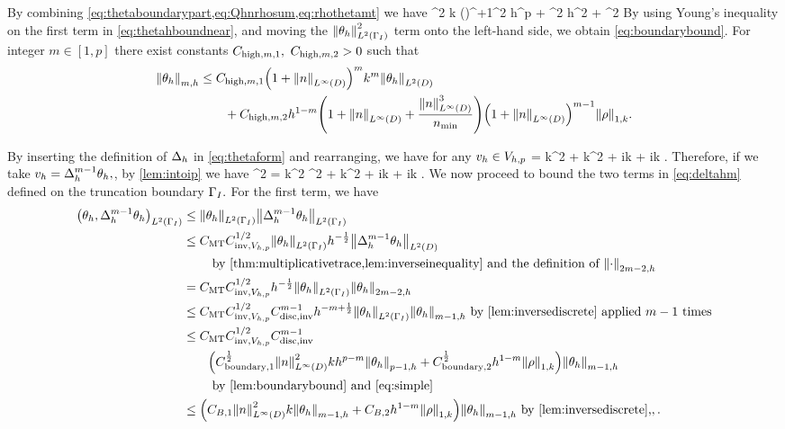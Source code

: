 \eeq
By combining \cref{eq:thetaboundarypart,eq:Qhnrhosum,eq:rhothetamt} we have
\beq\label{eq:thetahboundnear}
\NLtGI{\thetah}^2 \leq k \Cmess \mleft(\En\nvar\mright)^{+1}^2 h^p \NW{\rho} + \half \CMT^2  h\NW{\rho}^2 + \half \NLtGI{\thetah}^2
\eeq
By using Young's inequality on the first term in \cref{eq:thetahboundnear}, and moving the $\NLtGI{\thetah}^2$ term onto the left-hand side, we obtain \cref{eq:boundarybound}.
\epf
\tohere
{}\label{lem:higherbound}
For integer $m \in [1,p]$ there exist constants $C_{\mathrm{high},m,1},$ $C_{\mathrm{high},m,2} > 0$ such that
\begin{align}
\Nmh{\thetah} &\leq \Chighmo \mleft(1+\NLiD{n}\mright)^m k^m \NLtD{\thetah}\nonumber\\
&\quad\quad+ \Chighmt h^{1-m}\mleft(1+\NLiD{n} + \frac{\NLiD{n}^3}{\nmin}\mright)\mleft(1+\NLiD{n}\mright)^{m-1} \NW{\rho}.\label{eq:chigh}
\end{align}
\ele

By inserting the definition of $\Delta_{h}$ in \cref{eq:thetaform} and rearranging, we have for any $v_{h} \in V_{h,p}$
\beqs
\IPLtD{\Deltah \thetah}{\vh} = k^2 \IPLtDn{\thetah}{\vh} + k^2\IPLtD{\Qhn \rho}{\vh} + ik \IPLtGI{\thetah}{\vh} + ik \IPLtGI{\rho}{\vh}.
\eeqs
Therefore, if we take $v_{h} = \Delta_{h}^{m-1}\theta_{h},$, by \cref{lem:intoip} we have
\beq\label{eq:deltahm}
\Nmh{\thetah}^2 = k^2 ^2 + k^2  + ik + ik .
\eeq
We now proceed to bound the two terms in \cref{eq:deltahm} defined on the truncation boundary $\Gamma_{I}.$ For the first term, we have
\begin{align}
\IPLtGI{\thetah}{\Deltah^{m-1}\thetah} &\leq \NLtGI{\thetah}\NLtGI{\Deltah^{m-1}\thetah}\nonumber\\
&\leq \CMT \CinvVhp^{1/2} \NLtGI{\thetah} h^{-\half} \NLtD{\Deltah^{m-1} \thetah}\\
&\quad\quad\text{ by \cref{thm:multiplicativetrace,lem:inverseinequality} and the definition of }\Nfn{2m-2,h}{\cdot}\nonumber\\
&= \CMT \CinvVhp^{1/2} h^{-\half}\NLtGI{\thetah}\Nfn{2m-2,h}{\thetah}\nonumber\\
&\leq \CMT \CinvVhp^{1/2} \Chinv^{m-1} h^{-m+\half} \NLtGI{\thetah}\Nfn{m-1,h}{\thetah} \text{ by \cref{lem:inversediscrete} applied } m-1 \text{ times}\nonumber\\
&\leq \CMT \CinvVhp^{1/2} \Chinv^{m-1}\nonumber\\
&\quad\quad\mleft(\Cboundaryo^{\half} \NLiD{n}^2 k h^{p-m} \Nfn{p-1,h}{\thetah} + \Cboundaryt^{\half} h^{1-m} \NW{\rho}\mright)\Nfn{m-1,h}{\thetah}\\
&\quad\quad\text{ by \cref{lem:boundarybound} and \cref{eq:simple}}\nonumber\\
&\leq \mleft(\CBo \NLiD{n}^2k \Nfn{m-1,h}{\thetah} + \CBt h^{1-m} \NW{\rho}\mright)\Nfn{m-1,h}{\thetah} \text{ by \cref{lem:inversediscrete},},\label{eq:firstboundary}.
\end{align}

